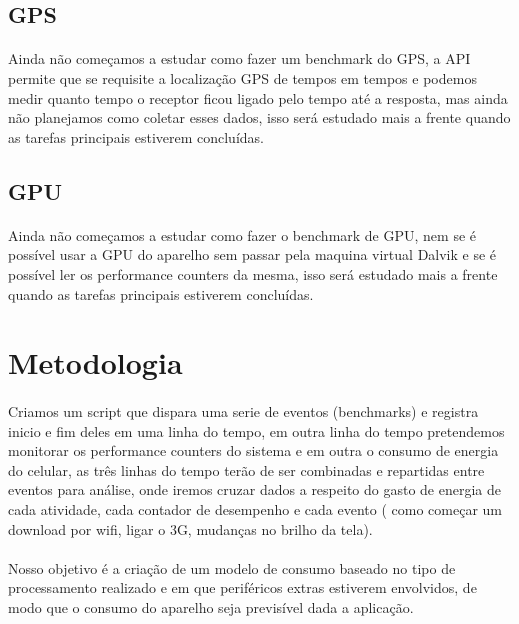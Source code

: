 \documentclass[11pt,a4paper,titlepage]{article}
\begin{document}
\subsection{GPS}
\paragraph{} Ainda não começamos a estudar como fazer um benchmark do GPS, a API permite que se requisite a localização GPS de tempos em tempos e podemos medir quanto tempo o receptor ficou ligado pelo tempo até a resposta, mas ainda não planejamos como coletar esses dados, isso será estudado mais a frente quando as tarefas principais estiverem concluídas.
\subsection{GPU}
\paragraph{} Ainda não começamos a estudar como fazer o benchmark de GPU, nem se é possível usar a GPU do aparelho sem passar pela maquina virtual Dalvik e se é possível ler os performance counters da mesma, isso será estudado mais a frente quando as tarefas principais estiverem concluídas.

\section{Metodologia}
\paragraph{} Criamos um script que dispara uma serie de eventos (benchmarks) e registra inicio e fim deles em uma linha do tempo, em outra linha do tempo pretendemos monitorar os performance counters do sistema e em outra o consumo de energia do celular, as três linhas do tempo terão de ser combinadas e repartidas entre eventos para análise, onde iremos cruzar dados a respeito do gasto de energia de cada atividade, cada contador de desempenho e cada evento ( como começar um download por wifi, ligar o 3G, mudanças no brilho da tela). 
\paragraph{} Nosso objetivo é a criação de um modelo de consumo baseado no tipo de processamento realizado e em que periféricos extras estiverem envolvidos, de modo que o consumo do aparelho seja previsível dada a aplicação.
\end{document}
